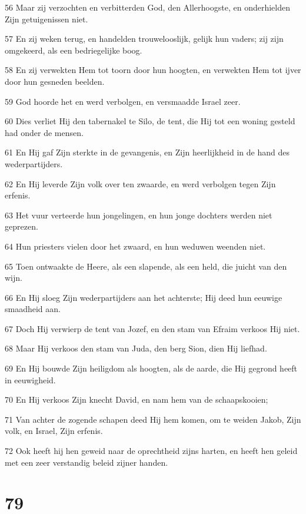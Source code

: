 \par 56 Maar zij verzochten en verbitterden God, den Allerhoogste, en onderhielden Zijn getuigenissen niet.
\par 57 En zij weken terug, en handelden trouwelooslijk, gelijk hun vaders; zij zijn omgekeerd, als een bedriegelijke boog.
\par 58 En zij verwekten Hem tot toorn door hun hoogten, en verwekten Hem tot ijver door hun gesneden beelden.
\par 59 God hoorde het en werd verbolgen, en versmaadde Israel zeer.
\par 60 Dies verliet Hij den tabernakel te Silo, de tent, die Hij tot een woning gesteld had onder de mensen.
\par 61 En Hij gaf Zijn sterkte in de gevangenis, en Zijn heerlijkheid in de hand des wederpartijders.
\par 62 En Hij leverde Zijn volk over ten zwaarde, en werd verbolgen tegen Zijn erfenis.
\par 63 Het vuur verteerde hun jongelingen, en hun jonge dochters werden niet geprezen.
\par 64 Hun priesters vielen door het zwaard, en hun weduwen weenden niet.
\par 65 Toen ontwaakte de Heere, als een slapende, als een held, die juicht van den wijn.
\par 66 En Hij sloeg Zijn wederpartijders aan het achterste; Hij deed hun eeuwige smaadheid aan.
\par 67 Doch Hij verwierp de tent van Jozef, en den stam van Efraim verkoos Hij niet.
\par 68 Maar Hij verkoos den stam van Juda, den berg Sion, dien Hij liefhad.
\par 69 En Hij bouwde Zijn heiligdom als hoogten, als de aarde, die Hij gegrond heeft in eeuwigheid.
\par 70 En Hij verkoos Zijn knecht David, en nam hem van de schaapskooien;
\par 71 Van achter de zogende schapen deed Hij hem komen, om te weiden Jakob, Zijn volk, en Israel, Zijn erfenis.
\par 72 Ook heeft hij hen geweid naar de oprechtheid zijns harten, en heeft hen geleid met een zeer verstandig beleid zijner handen.

\chapter{79}

